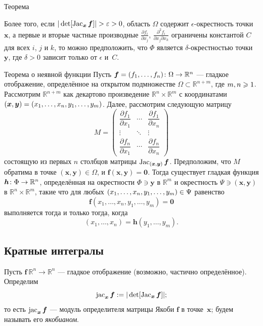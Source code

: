 {\begin{thm}{Теорема}
{}

Более того, если $|\det[\Jac_{\bm{x}}\bm{f}]|\z>\epsilon\z>0$, область $\Omega$ содержит $\epsilon$-окрестность точки $\bm{x}$,
а первые и вторые частные производные $\tfrac{\partial f_i}{\partial x_j}$, $\tfrac{\partial^2 f_i}{\partial x_j\partial x_k}$ ограничены константой $C$ для всех $i$, $j$ и $k$, то можно предположить, что $\Phi$ является $\delta$-окрестностью точки $\bm{y}$, где $\delta>0$ зависит только от $\epsilon$ и~$C$. 
\end{thm}

\begin{thm}{Теорема о неявной функции}\label{thm:imlicit}
Пусть $\bm{f}=(f_1,\dots,f_n)\:\Omega\z\to\mathbb{R}^n$ --- гладкое отображение, определённое на открытом подмножестве $\Omega\subset\mathbb{R}^{n+m}$, где
$m,n\z\ge 1$.
Рассмотрим $\mathbb{R}^{n+m}$ как декартово произведение $\mathbb{R}^n\times \mathbb{R}^m$ с координатами
$(\bm{x},\bm{y})\z=(x_1,\dots,x_n,y_1,\dots,y_m)$.
Далее, рассмотрим следующую матрицу
\[
M=\begin{pmatrix}
\dfrac{\partial f_1}{\partial x_1} & \cdots & \dfrac{\partial f_1}{\partial x_n}\\
\vdots & \ddots & \vdots\\
\dfrac{\partial f_n}{\partial x_1} & \cdots & \dfrac{\partial f_n}{\partial x_n} \end{pmatrix}\]
состоящую из первых $n$ столбцов матрицы $\mathop{\rm Jac}\nolimits_{(\bm{x},\bm{y})}\bm{f}$.
Предположим, что $M$ обратима в точке $(\bm{x},\bm{y})\in \Omega$, и $\bm{f}(\bm{x},\bm{y})=\bm{0}$.
Тогда существует гладкая функция $\bm{h}\:\Phi\z\to\mathbb{R}^n$, определённая на окрестности $\Phi\ni \bm{y}$ в $\mathbb{R}^m$
и окрестность $\Psi\ni (\bm{x},\bm{y})$ в $\mathbb{R}^n\times \mathbb{R}^m$, такие что
для любых $(x_1,\dots,x_n,y_1,\dots, y_m)\z\in \Psi$ равенство
\[\bm{f}(x_1,\dots,x_n,y_1,\dots, y_m)=\bm{0}\]
выполняется тогда и только тогда, когда
\[(x_1,\dots, x_n)=\bm{h}(y_1,\dots, y_m).\]

\end{thm}

\subsection*{Кратные интегралы}

Пусть $\bm{f}\:\mathbb{R}^n\to\mathbb{R}^n$ --- гладкое отображение (возможно, частично определённое).
Определим
\[\jac_{\bm{x}}\bm{f}\df|\det[\Jac_{\bm{x}}\bm{f}]|;
\index{10j@$\jac$ (определитель Якоби)}\]
то есть $\mathop{\rm jac}\nolimits_{\bm{x}}\bm{f}$ --- модуль определителя матрицы Якоби $\bm{f}$ в точке~$\bm{x}$;
будем называть его \emph{якобианом}.

}
